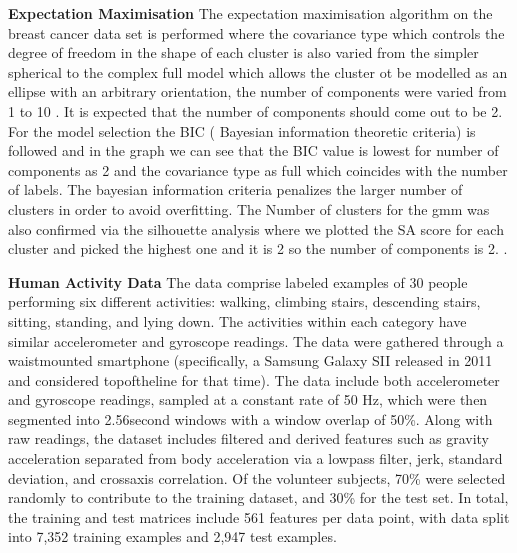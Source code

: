 \documentclass[a4paper,12pt]{article}
\begin{document}
\textbf{ Expectation Maximisation } The expectation maximisation algorithm on the breast cancer data set is performed where the covariance type which controls the degree of freedom in the shape of each cluster is also varied from the simpler spherical to the complex full model which allows the cluster ot be modelled as an ellipse with an arbitrary orientation, the number of components were varied from 1 to 10 . It is expected that the number of components should come out to be 2. For the model selection the BIC (  Bayesian information theoretic criteria)  is followed and in the graph we can see that the BIC value is lowest for number of components as 2 and the covariance type as full which coincides with the number of labels.  The bayesian information criteria penalizes the larger number of clusters in order to avoid overfitting. The Number of clusters for the gmm was also confirmed via the silhouette analysis where we plotted the SA score for each cluster and picked the highest one and it is 2 so the number of components is 2. \newline.

\textbf{ Human Activity Data}  The data comprise labeled examples of 30 people performing six different activities: walking, climbing stairs, descending stairs, sitting, standing, and lying down. The activities within each category have similar accelerometer and gyroscope readings.
The data were gathered through a waist­mounted smartphone (specifically, a Samsung Galaxy SII released in 2011 and considered top­of­the­line for that time). The data include both accelerometer and gyroscope readings, sampled at a constant rate of 50 Hz, which were then segmented into 2.56­second windows with a window overlap of 50\%. Along with raw readings, the dataset includes filtered and derived features such as gravity acceleration separated from body acceleration via a low­pass filter, jerk, standard deviation, and cross­axis correlation.
Of the volunteer subjects, 70\% were selected randomly to contribute to the training dataset, and 30\% for the test set. In total, the training and test matrices include 561 features per data point, with data split into 7,352 training examples and 2,947 test examples.
\end{document}
